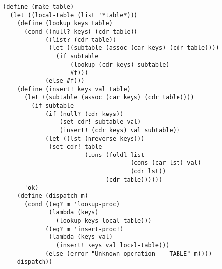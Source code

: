 \documentclass[a4paper,12pt]{article}
\begin{document}
\begin{lstlisting}
(define (make-table)
  (let ((local-table (list '*table*)))
    (define (lookup keys table)
      (cond ((null? keys) (cdr table))
            ((list? (cdr table))
             (let ((subtable (assoc (car keys) (cdr table))))
               (if subtable
                   (lookup (cdr keys) subtable)
                   #f)))
            (else #f)))
    (define (insert! keys val table)
      (let ((subtable (assoc (car keys) (cdr table))))
        (if subtable
            (if (null? (cdr keys))
                (set-cdr! subtable val)
                (insert! (cdr keys) val subtable))
            (let ((lst (nreverse keys)))
             (set-cdr! table
                       (cons (foldl list
                                    (cons (car lst) val)
                                    (cdr lst))
                             (cdr table))))))
      'ok)
    (define (dispatch m)
      (cond ((eq? m 'lookup-proc)
             (lambda (keys)
               (lookup keys local-table)))
            ((eq? m 'insert-proc!)
             (lambda (keys val)
               (insert! keys val local-table)))
            (else (error "Unknown operation -- TABLE" m))))
    dispatch))
\end{lstlisting}
\end{document}
